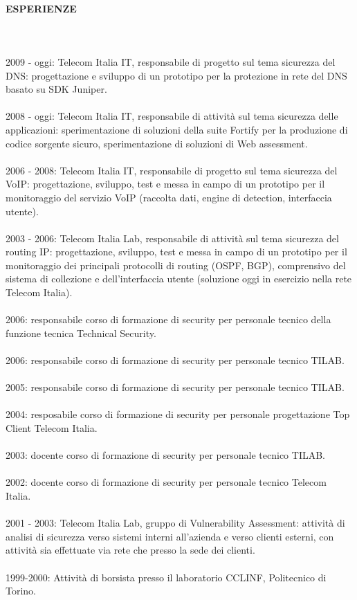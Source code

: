 \documentclass[a4paper, 10pt]{article}
\begin{document}
\paragraph{ESPERIENZE}
\ \\
\ \\
2009 - oggi: Telecom Italia IT, responsabile di progetto sul tema sicurezza del DNS: 
progettazione e sviluppo di un prototipo per la protezione in rete del DNS basato
su SDK Juniper.
\\
\ \\
2008 - oggi: Telecom Italia IT, responsabile di attivit\`a sul tema sicurezza 
delle applicazioni: sperimentazione di soluzioni della suite Fortify per la produzione
di codice sorgente sicuro, sperimentazione di soluzioni di Web assessment.
\\
\ \\
2006 - 2008: Telecom Italia IT, responsabile di progetto sul tema sicurezza del 
VoIP: progettazione, sviluppo, test e messa in campo di un prototipo per il 
monitoraggio del servizio VoIP (raccolta dati, engine di detection, interfaccia 
utente).
\\
\ \\
2003 - 2006: Telecom Italia Lab, responsabile di attivit\`a sul tema sicurezza 
del routing IP: progettazione, sviluppo, test e messa in campo di un prototipo 
per il monitoraggio dei principali protocolli di routing (OSPF, BGP), comprensivo
del sistema di collezione e dell'interfaccia utente (soluzione oggi in esercizio
nella rete Telecom Italia).
\\
\ \\
2006: responsabile corso di formazione di security per personale tecnico della 
funzione tecnica Technical Security.
\\
\ \\
2006: responsabile corso di formazione di security per personale tecnico TILAB.
\\ 
\ \\
2005: responsabile corso di formazione di security per personale tecnico TILAB.
\\
\ \\ 
2004: resposabile corso di formazione di security per personale progettazione 
Top Client Telecom Italia.
\\ 
\ \\
2003: docente corso di formazione di security per personale tecnico TILAB.
\\
\ \\
2002: docente corso di formazione di security per personale tecnico Telecom Italia.
\\
\ \\
2001 - 2003: Telecom Italia Lab, gruppo di Vulnerability Assessment: attivit\`a di 
analisi di sicurezza verso sistemi interni all'azienda e verso clienti esterni, 
con attivit\`a sia effettuate via rete che presso la sede dei clienti.
\\
\ \\
1999-2000: Attivit\`a di borsista presso il laboratorio CCLINF, Politecnico di Torino.
\\
\end{document}
